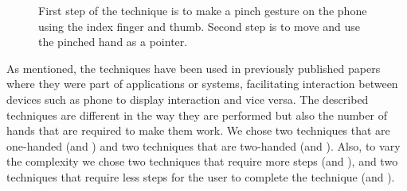 \begin{figure}[H]
\caption{
	\protect{} First step of the \pinch technique is to make a pinch gesture on the phone using the index finger and thumb. Second step is to move and use the pinched hand as a pointer.
}
\label{fig:pinchTechnique}
\end{figure}

As mentioned, the techniques have been used in previously published papers where they were part of applications or systems, facilitating interaction between devices such as phone to display interaction and vice versa. 
The described techniques are different in the way they are performed but also the number of hands that are required to make them work.
We chose two techniques that are one-handed (\swipe and \tilt) and two techniques that are two-handed (\throw and \pinch).
Also, to vary the complexity we chose two techniques that require more steps (\throw and \pinch), and two techniques that require less steps for the user to complete the technique (\swipe and \tilt).